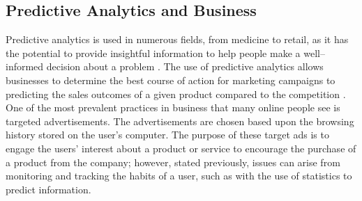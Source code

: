 \documentclass[a4paper, 12pt]{article}
\begin{document}
\subsection{Predictive Analytics and Business}
\begin{paragraph}
\indent Predictive analytics is used in numerous fields, from medicine to retail, as it has the potential to provide insightful information to help people make a well--informed decision about a problem \cite{Jeble2016}. The use of predictive analytics allows businesses to determine the best course of action for marketing campaigns to predicting the sales outcomes of a given product compared to the competition \cite{Jeble2016}. One of the most prevalent practices in business that many online people see is targeted advertisements. The advertisements are chosen based upon the browsing history stored on the user's computer. The purpose of these target ads is to engage the users' interest about a product or service to encourage the purchase of a product from the company; however, stated previously, issues can arise from monitoring and tracking the habits of a user, such as with the use of statistics to predict information.
\end{paragraph}

\end{document}
